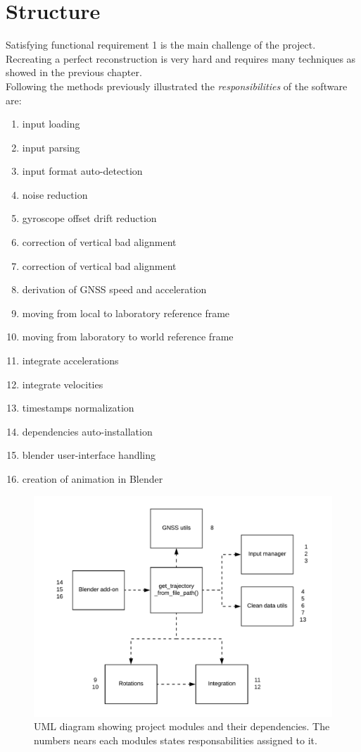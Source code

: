 \section{Structure}
Satisfying functional requirement 1 is the main challenge of the project. Recreating a perfect reconstruction is very hard and requires many techniques as showed in the previous chapter. \\
Following the methods previously illustrated the \textit{responsibilities} of the software are:
\begin{enumerate}
\item input loading
\item input parsing
\item input format auto-detection
\item noise reduction
\item gyroscope offset drift reduction
\item correction of vertical bad alignment
\item correction of vertical bad alignment
\item derivation of GNSS speed and acceleration
\item moving from local to laboratory reference frame
\item moving from laboratory to world reference frame
\item integrate accelerations
\item integrate velocities
\item timestamps normalization
\item dependencies auto-installation
\item blender user-interface handling
\item creation of animation in Blender
\end{enumerate}

\begin{figure}[H]
\includegraphics[width=\textwidth]{structure.png}
\caption{UML diagram showing project modules and their dependencies. The numbers nears each modules states responsabilities assigned to it.}
\end{figure}


